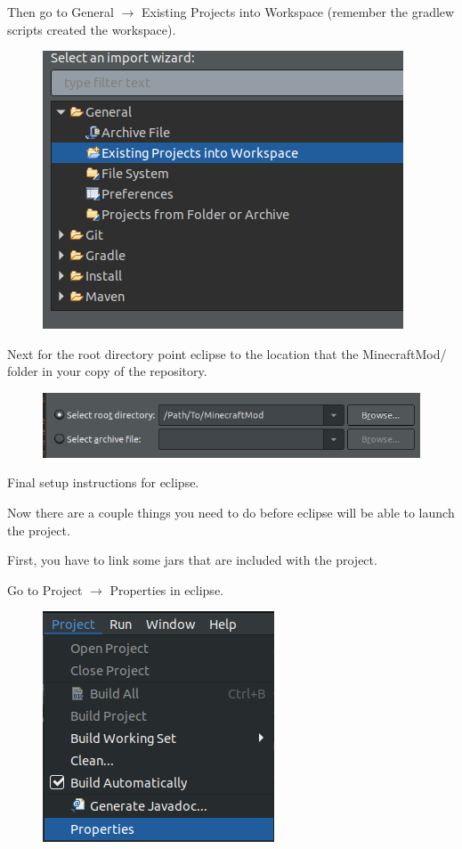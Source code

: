 \documentclass[12pt]{article}
\begin{document}
\begin{steps}
	  Then go to General $\rightarrow$ Existing Projects into Workspace (remember the gradlew scripts created the workspace).

	\begin{figure}[H]
		\includegraphics[scale=0.5]{images/setup/GeneralExisting.png}
		\centering
	\end{figure}

	Next for the root directory point eclipse to the location that the MinecraftMod/ folder in your copy of the repository.

	\begin{figure}[H]
		\includegraphics[scale=0.5]{images/setup/ImportDirectory.png}
		\centering
	\end{figure}


  \item Final setup instructions for eclipse.

	  Now there are a couple things you need to do before eclipse will be able to launch the project.

	  First, you have to link some jars that are included with the project.

	  Go to Project $\rightarrow$ Properties in eclipse.

	\begin{figure}[H]
		\includegraphics[scale=0.5]{images/setup/ProjectProperties.png}
		\centering
	\end{figure}



\end{steps}
\end{document}
